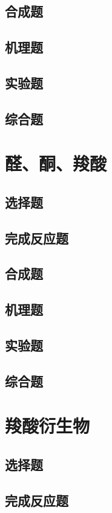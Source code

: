 \documentclass[
  10pt,
  twoside,
  openany,
  b5paper, %
  colorscheme = basic, %
]{qyxf-book}
\begin{document}
\section{合成题}
\section{机理题}
\section{实验题}
\section{综合题}

\chapter{醛、酮、羧酸}

\section{选择题}
\section{完成反应题}
\section{合成题}
\section{机理题}
\section{实验题}
\section{综合题}

\chapter{羧酸衍生物}

\section{选择题}
\section{完成反应题}
\end{document}

